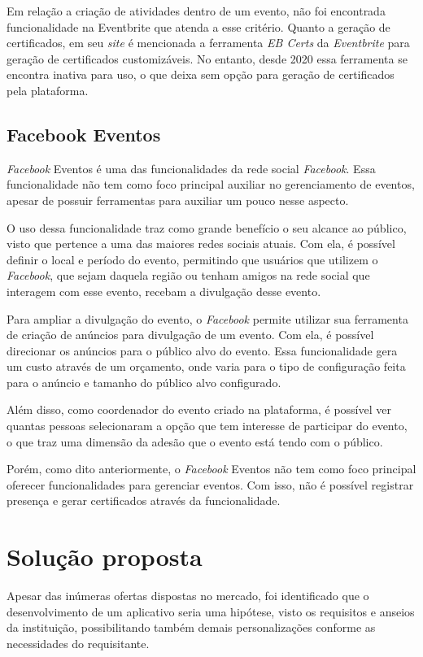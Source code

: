 Em relação a criação de atividades dentro de um evento, não foi encontrada funcionalidade na Eventbrite que atenda a esse critério. Quanto a geração de certificados, em seu \textit{site} é mencionada a ferramenta \textit{EB Certs} da \textit{Eventbrite} para geração de certificados customizáveis. No entanto, desde 2020 essa ferramenta se encontra inativa para uso, o que deixa sem opção para geração de certificados pela plataforma.

\subsection{Facebook Eventos}

\textit{Facebook} Eventos é uma das funcionalidades da rede social \textit{Facebook}. Essa funcionalidade não tem como foco principal auxiliar no gerenciamento de eventos, apesar de possuir ferramentas para auxiliar um pouco nesse aspecto.

O uso dessa funcionalidade traz como grande benefício o seu alcance ao público, visto que pertence a uma das maiores redes sociais atuais. Com ela, é possível definir o local e período do evento, permitindo que usuários que utilizem o \textit{Facebook}, que sejam daquela região ou tenham amigos na rede social que interagem com esse evento, recebam a divulgação desse evento.

Para ampliar a divulgação do evento, o \textit{Facebook} permite utilizar sua ferramenta de criação de anúncios para divulgação de um evento. Com ela, é possível direcionar os anúncios para o público alvo do evento. Essa funcionalidade gera um custo através de um orçamento, onde varia para o tipo de configuração feita para o anúncio e tamanho do público alvo configurado.

Além disso, como coordenador do evento criado na plataforma, é possível ver quantas pessoas selecionaram a opção que tem interesse de participar do evento, o que traz uma dimensão da adesão que o evento está tendo com o público.

Porém, como dito anteriormente, o \textit{Facebook} Eventos não tem como foco principal oferecer funcionalidades para gerenciar eventos. Com isso, não é possível registrar presença e gerar certificados através da funcionalidade.

\section{Solução proposta}

Apesar das inúmeras ofertas dispostas no mercado, foi identificado que o desenvolvimento de um aplicativo seria uma hipótese, visto os requisitos e anseios da instituição, possibilitando também demais personalizações conforme as necessidades do requisitante.

